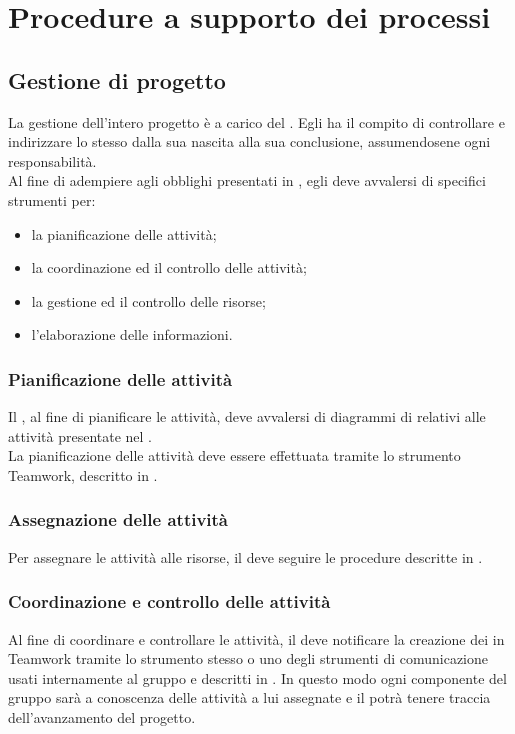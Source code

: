 \section{Procedure a supporto dei processi}
\subsection{Gestione di progetto}
La gestione dell'intero progetto è a carico del \Responsabile. Egli ha il compito di controllare e indirizzare lo stesso dalla sua nascita alla sua conclusione, assumendosene ogni responsabilità.\\
Al fine di adempiere agli obblighi presentati in , egli deve avvalersi di specifici strumenti per:
\begin{itemize}
	\item la pianificazione delle attività;
	\item la coordinazione ed il controllo delle attività;
	\item la gestione ed il controllo delle risorse;
	\item l'elaborazione delle informazioni.
\end{itemize}

\subsubsection{Pianificazione delle attività}
Il \Responsabile, al fine di pianificare le attività, deve avvalersi di diagrammi di  relativi alle attività presentate nel \PianoDiProgetto.\\
La pianificazione delle attività deve essere effettuata tramite lo strumento Teamwork, descritto in .

\subsubsection{Assegnazione delle attività}
Per assegnare le attività alle risorse, il \Responsabile{} deve seguire le procedure descritte in .

\subsubsection{Coordinazione e controllo delle attività}
Al fine di coordinare e controllare le attività, il \Responsabile{} deve notificare la creazione dei  in Teamwork tramite lo strumento stesso o uno degli strumenti di comunicazione usati internamente al gruppo e descritti in . In questo modo ogni componente del gruppo sarà a conoscenza delle attività a lui assegnate e il \Responsabile{} potrà tenere traccia dell'avanzamento del progetto.

